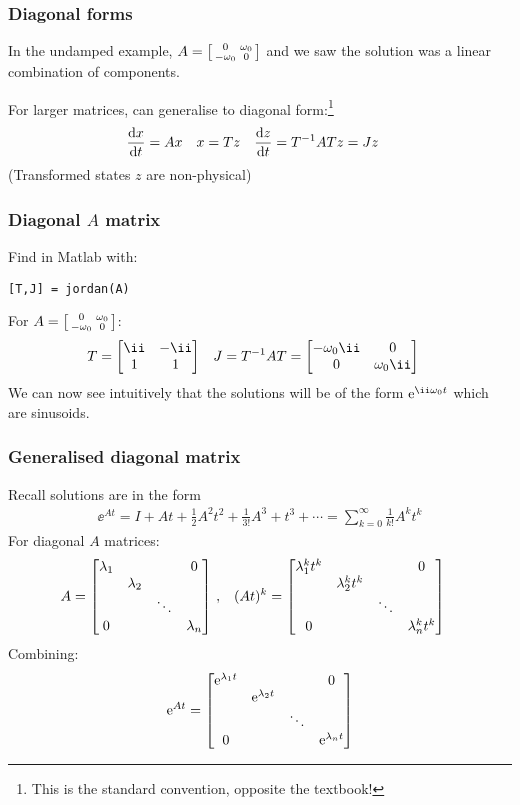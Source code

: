 \documentclass{beamer-control}
\begin{document}

\begin{frame}
\frametitle{Diagonal forms}
In the undamped example, $A = \left[\begin{smallmatrix} 0 & \omega_0\\ -\omega_0 & 0\end{smallmatrix}\right]$ and we saw the solution was a linear combination of components.

\bigskip
For larger matrices, can generalise to \alert{diagonal form}:\footnote{\alert{This is the standard convention, opposite the textbook!}}
\begin{align}
\frac{\mathrm{d} x}{\mathrm{d} t} &= Ax & x &= Tz & \frac{\mathrm{d} z}{\mathrm{d} t} &= T^{-1}ATz = Jz
\end{align}
(Transformed states $z$ are non-physical)

\end{frame}

\begin{frame}[fragile]
\frametitle{Diagonal $A$ matrix}
Find in Matlab with:
\begin{lstlisting}[style=Matlab-editor]
[T,J] = jordan(A)
\end{lstlisting}
For $A = \left[\begin{smallmatrix} 0 & \omega_0\\ -\omega_0 & 0\end{smallmatrix}\right]$:
\begin{align}
T &= \Matr{ \ii & -\ii \\ 1 & 1  } & J &= T^{-1}AT = \Matr{ -\ww_0 \ii & 0 \\ 0 & \ww_0 \ii}
\end{align}
We can now see intuitively that the solutions will be of the form $\ee^{\ii \ww_0 t}$ which are sinusoids.
\end{frame}

\begin{frame}
\frametitle{Generalised diagonal matrix}
Recall solutions are in the form
\begin{align}
\ee^{At} = I + At + \tfrac12 A^2t^2 + \tfrac{1}{3!}A^3+t^3 + \cdots = \sum_{k=0}^{\infty} \tfrac{1}{k!}A^kt^k
\end{align}
For diagonal $A$ matrices:
\begin{align}
A &= \begin{bmatrix} \lambda_1 &  &  & 0 \\  & \lambda_2 &  &  \\  &  & \ddots &  \\ 0 &  &  & \lambda_n \end{bmatrix} \,, &
(At)^k &= \begin{bmatrix} \lambda_1^kt^k &  &  & 0 \\  & \lambda_2^kt^k &  &  \\  &  & \ddots &  \\ 0 &  &  & \lambda_n^kt^k \end{bmatrix}
\end{align}
Combining:
\begin{align}\label{eq:diagform}
\mathrm{e}^{At} = \begin{bmatrix} \mathrm{e}^{\lambda_1 t} &  &  & 0 \\  & \mathrm{e}^{\lambda_2 t} &  &  \\  &  & \ddots &  \\ 0 &  &  & \mathrm{e}^{\lambda_n t} \end{bmatrix}
\end{align}

\end{frame}
\end{document}
